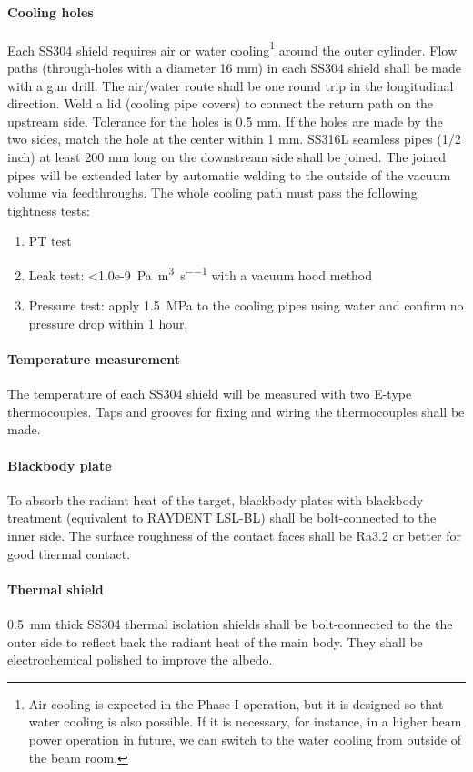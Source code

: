 \documentclass[12pt,a4paper]{article}
\begin{document}
\paragraph{Cooling holes}
Each SS304 shield requires air or water cooling\footnote{Air cooling is expected in the Phase-I operation, but it is designed so that water cooling is also possible. If it is necessary, for instance, in a higher beam power operation in future, we can switch to the water cooling from outside of the beam room.} around the outer cylinder. Flow paths (through-holes with a diameter 16 mm) in each SS304 shield shall be made with a gun drill. The air/water route shall be one round trip in the longitudinal direction. Weld a lid (cooling pipe covers) to connect the return path on the upstream side. Tolerance for the holes is 0.5 mm. If the holes are made by the two sides, match the hole at the center within 1 mm. 
SS316L seamless pipes (1/2 inch) at least 200 mm long on the downstream side shall be joined. The joined pipes will be extended later by automatic welding to the outside of the vacuum volume via feedthroughs. The whole cooling path must pass the following tightness tests:
\begin{enumerate}[itemsep=3pt, parsep=0pt]
\item PT test
\item Leak test: \SI{<1.0e-9}{\pascal\per\cubic\metre\per\second} with a vacuum hood method
\item Pressure test: apply \SI{1.5}{\mega\pascal} to the cooling pipes using water and confirm no pressure drop within 1 hour.
\end{enumerate}

\paragraph{Temperature measurement}
The temperature of each SS304 shield will be measured with two E-type thermocouples. Taps and grooves for fixing and wiring the thermocouples shall be made. 

\paragraph{Blackbody plate}
 To absorb the radiant heat of the target, blackbody plates with blackbody treatment (equivalent to RAYDENT LSL-BL) shall be bolt-connected to the inner side. The surface roughness of the contact faces shall be Ra3.2 or better for good thermal contact. 

\paragraph{Thermal shield}
\SI{0.5}{\mm} thick SS304 thermal isolation shields shall be bolt-connected to the the outer side to reflect back the radiant heat of the main body. They shall be electrochemical polished to improve the albedo.    %
\end{document}
